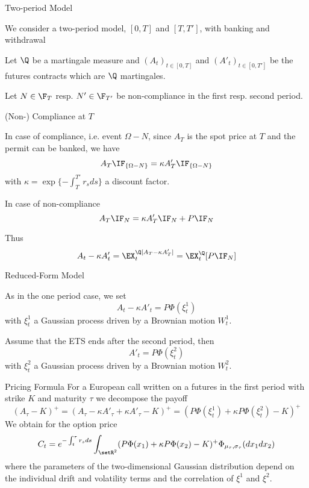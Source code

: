 
{Two-period Model}






	We consider a two-period model, $[0,T]$ and $[T,T']$, with banking and withdrawal


	Let $\Q$ be a martingale measure and $(A_t)_{t\in[0,T]}$ and $(A'_t)_{t\in[0,T']}$
be the futures contracts which are $\Q$ martingales.


	Let $N\in \F_T$ resp. $N' \in \F_{T'}$ be non-compliance in the first resp. second period.





{(Non-) Compliance at $T$}






	In case of compliance, i.e. event $\Omega-N$, since $A_T$ is the spot price at $T$ and the permit can be banked,  we have
$$
A_T\IF_{\{\Omega-N\}}= \kappa A'_T \IF_{\{\Omega-N\}}
$$
with $\kappa= \exp\{-\int_T^{T'}r_s ds\}$ a discount factor.


	In case of non-compliance
$$
A_T\IF_{N}= \kappa A'_T \IF_{N} + P\IF_N
$$


	Thus
$$
A_t-\kappa A'_t = \EX_t^\Q[A_T-\kappa A'_T]= \EX^\Q_t[P \IF_N]
$$





{Reduced-Form Model}






	As in the one period case,  we set
$$
A_t-\kappa A'_t = P \Phi(\xi_t^1)
$$
with $\xi^1_t$ a Gaussian process driven by a Brownian motion $W^1_t$.


	Assume that the ETS ends after the second period, then
$$
A'_t = P \Phi(\xi^2_t)
$$
with $\xi^2_t$ a Gaussian process driven by a Brownian motion $W^2_t$.





{Pricing Formula}
For a European call written on a futures in the first period with strike $K$ and maturity $\tau$ we decompose the payoff
$$
(A_\tau-K)^+= (A_\tau - \kappa A'_\tau + \kappa A'_\tau -K )^+= (P\Phi(\xi^1_t) + \kappa P \Phi(\xi_t^2) -K)^+
$$
We obtain for the option price
$$
C_t = e^{-\int_t^\tau r_s ds} \int_{\setR^2} (P\Phi(x_1)+\kappa P \Phi(x_2) -K)^+ \Phi_{\mu_\tau, \sigma_\tau}(dx_1dx_2)
$$
where the parameters of the two-dimensional Gaussian distribution depend on the individual drift and volatility terms and the correlation
of $\xi^1$ and $\xi^2$.


